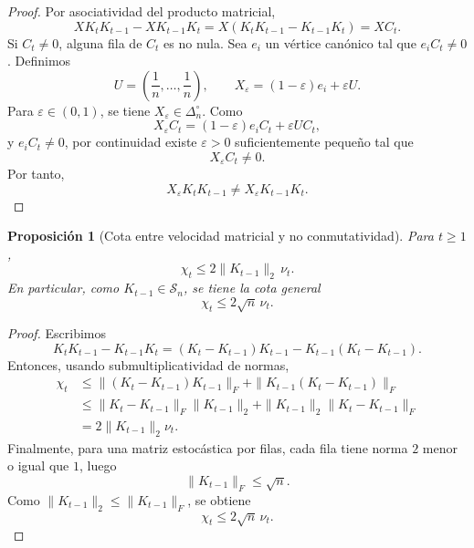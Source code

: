 \documentclass[12pt]{article}
\newtheorem{proposicion}{Proposición}[section]
\begin{document}
\begin{proof}
Por asociatividad del producto matricial,
\[
XK_tK_{t-1}-XK_{t-1}K_t
=
X(K_tK_{t-1}-K_{t-1}K_t)
=
XC_t.
\]
Si \(C_t\neq 0\), alguna fila de \(C_t\) es no nula. Sea \(e_i\) un vértice
canónico tal que \(e_iC_t\neq 0\). Definimos
\[
U=\left(\frac1n,\dots,\frac1n\right),
\qquad
X_\varepsilon=(1-\varepsilon)e_i+\varepsilon U.
\]
Para \(\varepsilon\in(0,1)\), se tiene \(X_\varepsilon\in\Delta_n^\circ\). Como
\[
X_\varepsilon C_t
=
(1-\varepsilon)e_iC_t+
\varepsilon UC_t,
\]
y \(e_iC_t\neq 0\), por continuidad existe \(\varepsilon>0\) suficientemente
pequeño tal que
\[
X_\varepsilon C_t\neq 0.
\]
Por tanto,
\[
X_\varepsilon K_tK_{t-1}
\neq
X_\varepsilon K_{t-1}K_t.
\]
\end{proof}

\begin{proposicion}[Cota entre velocidad matricial y no conmutatividad]
Para \(t\geq 1\),
\[
\chi_t
\leq
2\|K_{t-1}\|_2\,\nu_t.
\]
En particular, como \(K_{t-1}\in\mathcal S_n\), se tiene la cota general
\[
\chi_t
\leq
2\sqrt n\,\nu_t.
\]
\end{proposicion}

\begin{proof}
Escribimos
\[
K_tK_{t-1}-K_{t-1}K_t
=
(K_t-K_{t-1})K_{t-1}-K_{t-1}(K_t-K_{t-1}).
\]
Entonces, usando submultiplicatividad de normas,
\begin{align*}
\chi_t
&\leq
\|(K_t-K_{t-1})K_{t-1}\|_F
+
\|K_{t-1}(K_t-K_{t-1})\|_F\\
&\leq
\|K_t-K_{t-1}\|_F\|K_{t-1}\|_2
+
\|K_{t-1}\|_2\|K_t-K_{t-1}\|_F\\
&=
2\|K_{t-1}\|_2\nu_t.
\end{align*}
Finalmente, para una matriz estocástica por filas, cada fila tiene norma
\(2\) menor o igual que \(1\), luego
\[
\|K_{t-1}\|_F\leq \sqrt n.
\]
Como \(\|K_{t-1}\|_2\leq\|K_{t-1}\|_F\), se obtiene
\[
\chi_t\leq 2\sqrt n\,\nu_t.
\]
\end{proof}
\end{document}
